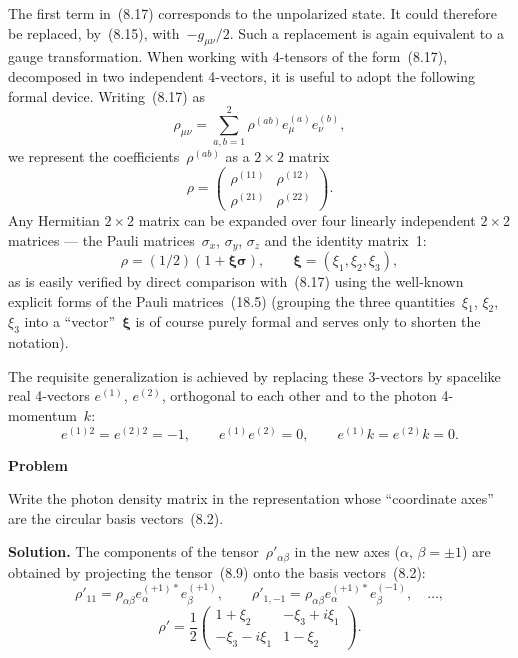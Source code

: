 The first term in~(8.17) corresponds to the unpolarized state. It could therefore be replaced, by~(8.15), with~$-g_{\mu\nu}/2$. Such a replacement is again equivalent to a gauge transformation. When working with 4-tensors of the form~(8.17), decomposed in two independent 4-vectors, it is useful to adopt the following formal device. Writing~(8.17) as
\[
\rho_{\mu\nu} = \sum_{a,b=1}^{2}\rho^{(ab)}e_\mu^{(a)}e_\nu^{(b)},
\]
we represent the coefficients~$\rho^{(ab)}$ as a $2\times 2$ matrix
\[
\rho = \begin{pmatrix}\rho^{(11)} & \rho^{(12)} \\ \rho^{(21)} & \rho^{(22)}\end{pmatrix}.
\]
Any Hermitian $2\times 2$ matrix can be expanded over four linearly independent $2\times 2$ matrices --- the Pauli matrices~$\sigma_x$, $\sigma_y$, $\sigma_z$ and the identity matrix~1:
\begin{equation}
\rho = (1/2)(1 + \boldsymbol{\xi\sigma}), \qquad \boldsymbol{\xi} = (\xi_1, \xi_2, \xi_3),
\tag{8.18}
\end{equation}
as is easily verified by direct comparison with~(8.17) using the well-known explicit forms of the Pauli matrices~(18.5) (grouping the three quantities~$\xi_1$, $\xi_2$, $\xi_3$ into a ``vector''~$\boldsymbol{\xi}$ is of course purely formal and serves only to shorten the notation).

The requisite generalization is achieved by replacing these 3-vectors by spacelike real 4-vectors $e^{(1)}$, $e^{(2)}$, orthogonal to each other and to the photon 4-momentum~$k$:
\begin{equation}
e^{(1)2} = e^{(2)2} = -1, \qquad e^{(1)}e^{(2)} = 0, \qquad e^{(1)}k = e^{(2)}k = 0.
\tag{8.16}
\end{equation}

\medskip\noindent\textbf{Problem}

Write the photon density matrix in the representation whose ``coordinate axes'' are the circular basis vectors~(8.2).

\noindent\textbf{Solution.} The components of the tensor~$\rho'_{\alpha\beta}$ in the new axes ($\alpha$, $\beta = \pm 1$) are obtained by projecting the tensor~(8.9) onto the basis vectors~(8.2):
\[
\rho'_{11} = \rho_{\alpha\beta}e_\alpha^{(+1)*}e_\beta^{(+1)}, \qquad \rho'_{1,-1} = \rho_{\alpha\beta}e_\alpha^{(+1)*}e_\beta^{(-1)}, \quad \ldots,
\]
\[
\rho' = \frac{1}{2}\begin{pmatrix}1 + \xi_2 & -\xi_3 + i\xi_1 \\ -\xi_3 - i\xi_1 & 1 - \xi_2\end{pmatrix}.
\]

